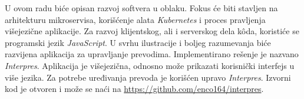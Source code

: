 U ovom radu biće opisan razvoj softvera u oblaku. Fokus će biti stavljen na 
arhitekturu mikroservisa, korišćenje alata \textit{Kubernetes} i proces pravljenja 
višejezične aplikacije. Za razvoj klijentskog, ali i serverskog dela 
kôda, koristiće se programski jezik \textit{JavaScript}. U svrhu ilustracije i
boljeg razumevanja biće razvijena aplikacija za upravljanje prevodima. 
Implementirano rešenje je nazvano \textit{Interpres}. Aplikacija je 
višejezična, odnosno može prikazati korisnički interfejs u više 
jezika. Za potrebe uređivanja prevoda je korišćen upravo \textit{Interpres}.
Izvorni kod je otvoren i može se naći na \url{https://github.com/enco164/interpres}.




